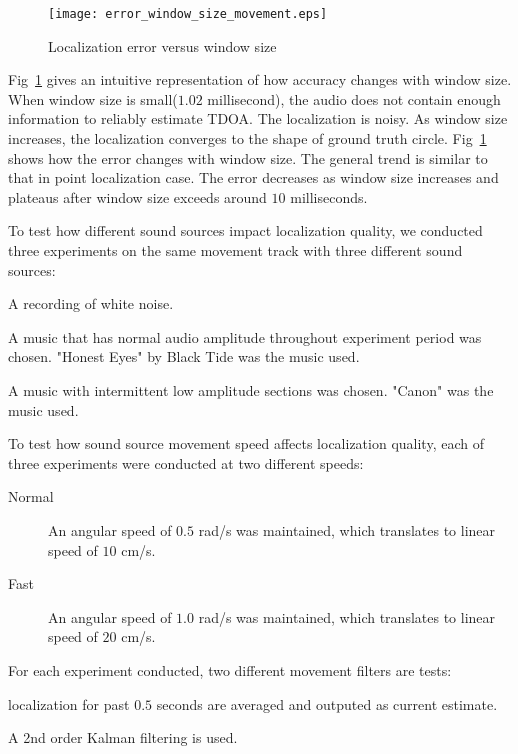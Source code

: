 \begin{figure}[]
\texttt{[image: error\_window\_size\_movement.eps]}
\caption{Localization error versus window size}
\label{fig:err_win_circle}
\end{figure}


Fig~\ref{fig:err_win_circle} gives an intuitive representation of how accuracy changes with window size. When window size is small($1.02$ millisecond), the audio does not contain enough information to reliably estimate TDOA. The localization is noisy. As window size increases, the localization converges to the shape of ground truth circle. Fig~\ref{fig:err_win_circle} shows how the error changes with window size. The general trend is similar to that in point localization case. The error decreases as window size increases and plateaus after window size exceeds around $10$ milliseconds.

To test how different sound sources impact localization quality, we conducted three experiments on the same movement track with three different sound sources:

\begin{description}

\item[White Noise] A recording of white noise.

\item[Music A] A music that has normal audio amplitude throughout experiment period was chosen. "Honest Eyes" by Black Tide was the music used.

\item[Music B] A music with intermittent low amplitude sections was chosen. "Canon" was the music used.

\end{description} 

To test how sound source movement speed affects localization quality, each of three experiments were conducted at two different speeds:
\begin{description}
\item[Normal] An angular speed of $0.5$ rad/s was maintained, which translates to linear speed of $10$ cm/s.
\item[Fast] An angular speed of $1.0$ rad/s was maintained, which translates to linear speed of $20$ cm/s.
\end{description}

For each experiment conducted, two different movement filters are tests:
\begin{description}
\item[Averaging filter] localization for past $0.5$ seconds are averaged and outputed as current estimate.
\item[Kalman filter] A 2nd order Kalman filtering is used.
\end{description}

